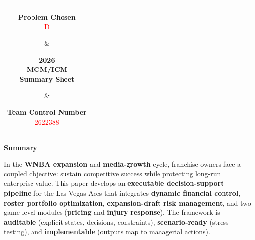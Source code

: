 \documentclass[12pt]{article}
\title{\vspace{-1.2em}\Large\bfseries \PaperTitle}
\author{}
\date{}
\newcommand{\Problem}{D}           %
\newcommand{\TeamNumber}{2622388}  %
\numberwithin{figure}{section}
\numberwithin{table}{section}
\begin{document}
	
	\thispagestyle{empty}
	
	\begin{center}
		\begin{tabular}{ccc}
			\parbox[t]{0.30\linewidth}{\centering\textbf{Problem Chosen}\\[0.3em]\Large\textcolor{red}{\Problem}}
			&
			\parbox[t]{0.30\linewidth}{\centering\textbf{2026}\\ \textbf{MCM/ICM}\\ \textbf{Summary Sheet}}
			&
			\parbox[t]{0.30\linewidth}{\centering\textbf{Team Control Number}\\[0.3em]\Large\textcolor{red}{\TeamNumber}}\\
			\hline
		\end{tabular}
	\end{center}
	
	\vspace{1.0em}
	\begin{center}
		{\Large\bfseries Summary}\\[0.4em]
	\end{center}
	

	
	

	In the \textbf{WNBA expansion} and \textbf{media-growth} cycle, franchise owners face a coupled objective: sustain competitive success while protecting long-run enterprise value. This paper develops an \textbf{executable decision-support pipeline} for the Las Vegas Aces that integrates \textbf{dynamic financial control}, \textbf{roster portfolio optimization}, \textbf{expansion-draft risk management}, and two game-level modules (\textbf{pricing} and \textbf{injury response}). The framework is \textbf{auditable} (explicit states, decisions, constraints), \textbf{scenario-ready} (stress testing), and \textbf{implementable} (outputs map to managerial actions).
	
\end{document}
